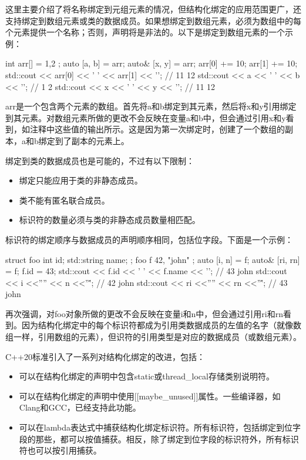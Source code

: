 
这里主要介绍了将名称绑定到元组元素的情况，但结构化绑定的应用范围更广，还支持绑定到数组元素或类的数据成员。如果想绑定到数组元素，必须为数组中的每个元素提供一个名称；否则，声明将是非法的。以下是绑定到数组元素的一个示例：

\begin{cpp}
int arr[] = { 1,2 };
auto [a, b] = arr;
auto& [x, y] = arr;
arr[0] += 10;
arr[1] += 10;
std::cout << arr[0] << ' ' << arr[1] << '\n'; // 11 12
std::cout << a << ' ' << b << '\n';           // 1 2
std::cout << x << ' ' << y << '\n';           // 11 12
\end{cpp}

arr是一个包含两个元素的数组。首先将a和b绑定到其元素，然后将x和y引用绑定到其元素。对数组元素所做的更改不会反映在变量a和b中，但会通过引用x和y看到，如注释中这些值的输出所示。这是因为第一次绑定时，创建了一个数组的副本，a和b绑定到了副本的元素上。

绑定到类的数据成员也是可能的，不过有以下限制：

\begin{itemize}
\item
绑定只能应用于类的非静态成员。

\item
类不能有匿名联合成员。

\item
标识符的数量必须与类的非静态成员数量相匹配。
\end{itemize}

标识符的绑定顺序与数据成员的声明顺序相同，包括位字段。下面是一个示例：

\begin{cpp}
struct foo
{
    int         id;
    std::string name;
};
foo f{ 42, "john" };
auto [i, n] = f;
auto& [ri, rn] = f;
f.id = 43;
std::cout << f.id << ' ' << f.name << '\n';   // 43 john
std::cout << i <<'''' << n <<''\'';           // 42 john
std::cout << ri <<'''' << rn <<''\'';         // 43 john
\end{cpp}

再次强调，对foo对象所做的更改不会反映在变量i和n中，但会通过引用ri和rn看到。因为结构化绑定中的每个标识符都成为引用类数据成员的左值的名字（就像数组一样，引用数组的元素），但识符的引用类型是对应的数据成员（或数组元素）。

C++20标准引入了一系列对结构化绑定的改进，包括：

\begin{itemize}
\item
可以在结构化绑定的声明中包含static或thread\_local存储类别说明符。

\item
可以在结构化绑定的声明中使用[[maybe\_unused]]属性。一些编译器，如Clang和GCC，已经支持此功能。

\item
可以在lambda表达式中捕获结构化绑定标识符。所有标识符，包括绑定到位字段的那些，都可以按值捕获。相反，除了绑定到位字段的标识符外，所有标识符也可以按引用捕获。
\end{itemize}

